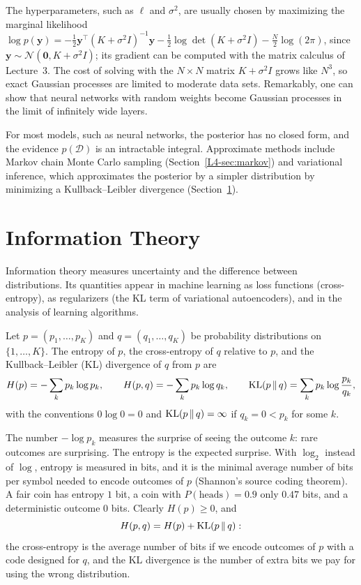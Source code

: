 The hyperparameters, such as $\ell$ and $\sigma^2$, are usually chosen by maximizing the marginal likelihood $\log p(\mathbf{y}) = -\frac{1}{2}\mathbf{y}^\top(K + \sigma^2 I)^{-1}\mathbf{y} - \frac{1}{2}\log\det(K + \sigma^2 I) - \frac{N}{2}\log(2\pi)$, since $\mathbf{y} \sim \mathcal{N}(\mathbf{0}, K + \sigma^2 I)$; its gradient can be computed with the matrix calculus of Lecture~3. The cost of solving with the $N \times N$ matrix $K + \sigma^2 I$ grows like $N^3$, so exact Gaussian processes are limited to moderate data sets. Remarkably, one can show that neural networks with random weights become Gaussian processes in the limit of infinitely wide layers.

\begin{remark}
    For most models, such as neural networks, the posterior has no closed form, and the evidence $p(\mathcal{D})$ is an intractable integral. Approximate methods include Markov chain Monte Carlo sampling (Section~\ref{L4-sec:markov}) and variational inference, which approximates the posterior by a simpler distribution by minimizing a Kullback--Leibler divergence (Section~\ref{L4-sec:information}).
\end{remark}

\section{Information Theory}\label{L4-sec:information}

Information theory measures uncertainty and the difference between distributions. Its quantities appear in machine learning as loss functions (cross-entropy), as regularizers (the KL term of variational autoencoders), and in the analysis of learning algorithms.

\begin{definition}\label{L4-def:entropy}
    Let $p = (p_1, \ldots, p_K)$ and $q = (q_1, \ldots, q_K)$ be probability distributions on $\{1, \ldots, K\}$. The entropy of $p$, the cross-entropy of $q$ relative to $p$, and the Kullback--Leibler (KL) divergence of $q$ from $p$ are
    \[H(p) = -\sum_k p_k\log p_k, \qquad H(p, q) = -\sum_k p_k\log q_k, \qquad \operatorname{KL}(p \,\|\, q) = \sum_k p_k\log\frac{p_k}{q_k},\]
    with the conventions $0\log 0 = 0$ and $\operatorname{KL}(p \,\|\, q) = \infty$ if $q_k = 0 < p_k$ for some $k$.
\end{definition}

The number $-\log p_k$ measures the surprise of seeing the outcome $k$: rare outcomes are surprising. The entropy is the expected surprise. With $\log_2$ instead of $\log$, entropy is measured in bits, and it is the minimal average number of bits per symbol needed to encode outcomes of $p$ (Shannon's source coding theorem). A fair coin has entropy $1$ bit, a coin with $P(\text{heads}) = 0.9$ only $0.47$ bits, and a deterministic outcome $0$ bits. Clearly $H(p) \geq 0$, and
\[H(p, q) = H(p) + \operatorname{KL}(p \,\|\, q):\]
the cross-entropy is the average number of bits if we encode outcomes of $p$ with a code designed for $q$, and the KL divergence is the number of extra bits we pay for using the wrong distribution.


